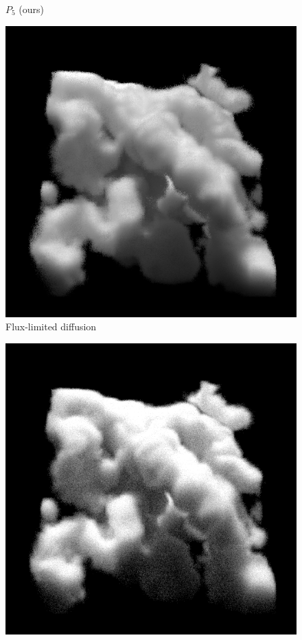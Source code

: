 {\begin{subfigure}{0.24\linewidth}
\vspace{-0.17in}
\caption{$P_5$ (ours)}
\label{fig:nebulae_ours}
\label{fig:teaser_pn}
\end{subfigure}%
\hspace{0.002\linewidth}
\begin{subfigure}{0.24\linewidth}
\includegraphics[width=\linewidth]{images/nebulae_ms_fld.png}
\vspace{-0.17in}
\caption{Flux-limited diffusion}
\label{fig:teaser_fld}
\end{subfigure}%
\hspace{0.002\linewidth}
\begin{subfigure}{0.24\linewidth}
\includegraphics[width=\linewidth]{images/nebulae_ms_groundtruth.png}

\end{subfigure}}
